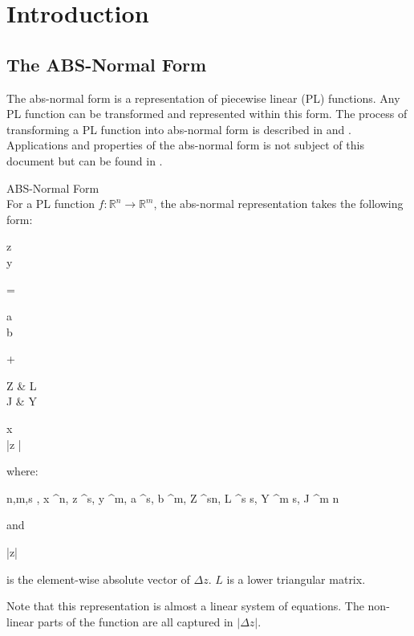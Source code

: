 \section{Introduction}

\subsection{The ABS-Normal Form}
The abs-normal form is a representation of piecewise linear (PL) functions. Any PL function can be transformed and represented within this form. The process of transforming a PL function into abs-normal form is described in \cite{Griewank2013} and \cite{Griewank2017}. Applications and properties of the abs-normal form is not subject of this document but can be found in \cite{Griewank2017}.

\begin{mydef*}
	ABS-Normal Form \\
	For a PL function $f:\mathbb{R}^n \rightarrow \mathbb{R}^m$, the abs-normal representation takes the following form:
	\begin{flalign} \label{absnf}
	\begin{pmatrix}
	\Delta z \\
	\Delta y
	\end{pmatrix}
	= 
	\begin{pmatrix}
	a \\
	b
	\end{pmatrix}
	+
	\begin{pmatrix}
	Z & L \\
	J & Y 
	\end{pmatrix}
	\times
	\begin{pmatrix}
	\Delta x \\
	|\Delta z |
	\end{pmatrix}
	\end{flalign}
	where:
	\begin{flalign*}
		n,m,s \in {}, \Delta x \in {}^n, \Delta z \in {}^s, \Delta y \in {}^m, a \in {}^s, b \in {}^{m}, Z \in {}^{s\times n}, L \in {}^{s \times s}, Y \in {}^{m \times s}, J \in {}^{m \times n}
	\end{flalign*}
	and 
	\begin{flalign*}
		|\Delta z|
	\end{flalign*}
	is the element-wise absolute vector of $\Delta z$. $L$ is a lower triangular matrix.
\end{mydef*}
Note that this representation is almost a linear system of equations. The non-linear parts of the function are all captured in $|\Delta z|$.

